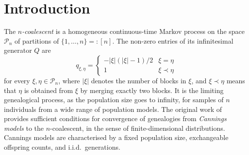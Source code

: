 \documentclass[12pt,authoryear]{article}
\theoremstyle{definition}
\newcommand{\1}[1]{\mathbbm{1}_{#1}}
\begin{document}







\section{Introduction}\label{sec:intro}

The \emph{$n$-coalescent} \citep{kingman1982coal, kingman1982exch,kingman1982gene} is a homogeneous continuous-time Markov process on the space $\mathcal{P}_n$ of partitions of $\{1,\dots,n\} =: [ n ]$.
The non-zero entries of its infinitesimal generator $Q$ are
\begin{equation*}
q_{\xi,\eta} = \begin{cases}
-|\xi|(|\xi|-1)/2 & \xi=\eta \\
1 & \xi \prec \eta
\end{cases}
\end{equation*}
for every $\xi, \eta \in \mathcal{P}_n$, where $|\xi|$ denotes the number of blocks in $\xi$, and $\xi \prec \eta$ means that $\eta$ is obtained from $\xi$ by merging exactly two blocks.
It is the limiting genealogical process, as the population size goes to infinity, for samples of $n$ individuals from a wide range of population models.
The original work of \citet{kingman1982gene} provides sufficient conditions for convergence of genealogies from \emph{Cannings models} to the $n$-coalescent, in the sense of finite-dimensional distributions.
Cannings models are characterised by a fixed population size, exchangeable offspring counts, and i.i.d.\ generations.
\end{document}

